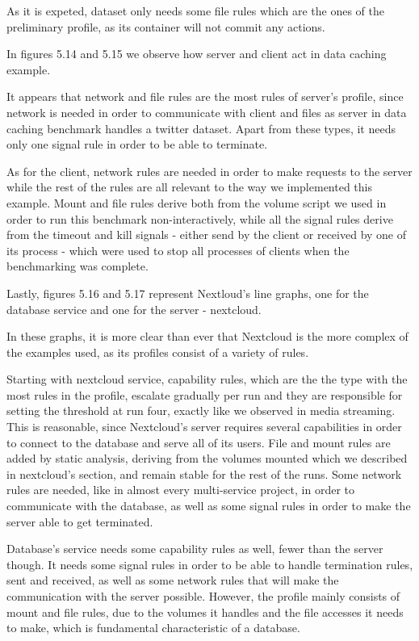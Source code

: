 As it is expeted, dataset only needs some file rules which are the ones of the preliminary profile, as its container will not commit any actions.

In figures 5.14 and 5.15 we observe how server and client act in data caching example. 

It appears that network and file rules are the most rules of server's profile, since network is needed in order to communicate with client and files as server in data caching benchmark handles a twitter dataset. Apart from these types, it needs only one signal rule in order to be able to terminate.

As for the client, network rules are needed in order to make requests to the server while the rest of the rules are all relevant to the way we implemented this example. Mount and file rules derive both from the volume script we used in order to run this benchmark non-interactively, while all the signal rules derive from the timeout and kill signals - either send by the client or received by one of its process - which were used to stop all processes of clients when the benchmarking was complete.

Lastly, figures 5.16 and 5.17 represent Nextloud's line graphs, one for the database service and one for the server - nextcloud.

In these graphs, it is more clear than ever that Nextcloud is the more complex of the examples used, as its profiles consist of a variety of rules. 

Starting with nextcloud service, capability rules, which are the the type with the most rules in the profile, escalate gradually per run and they are responsible for setting the threshold at run four, exactly like we observed in media streaming. This is reasonable, since Nextcloud's server requires several capabilities in order to connect to the database and serve all of its users.  File and mount rules are added by static analysis, deriving from the volumes mounted which we described in nextcloud's section, and remain stable for the rest of the runs. Some network rules are needed, like in almost every multi-service project, in order to communicate with the database, as well as some signal rules in order to make the server able to get terminated.

Database's service needs some capability rules as well, fewer than the server though. It needs some signal rules in order to be able to handle termination rules, sent and received, as well as some network rules that will make the communication with the server possible. However, the profile mainly consists of mount and file rules, due to the volumes it handles and the file accesses it needs to make, which is fundamental characteristic of a database.
 
